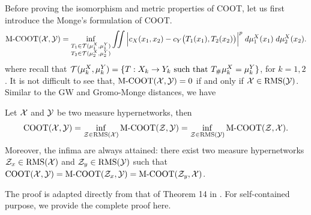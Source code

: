 Before proving the isomorphism and metric properties of COOT, let us first introduce the Monge's
formulation of COOT.
\begin{align}
  \text{M-COOT}(\mathcal X, \mathcal Y) =
  \inf_{\substack{T_1 \in \mathcal T(\mu^X_1, \mu^Y_1) \\ T_2 \in \mathcal T(\mu^X_2, \mu^Y_2)}}
  \iint \Big|c_X(x_1, x_2) - c_Y \big( T_1(x_1), T_2(x_2) \big) \Big|^p
  \; d\mu^X_1(x_1) \; d\mu^X_2(x_2).
\end{align}
where recall that
$\mathcal T(\mu^X_k, \mu^Y_k) = \{T: X_k \to Y_k \text{ such that } T_{\#} \mu^X_k = \mu^Y_k \}$,
for $k=1,2$. It is not difficult to see that, $\text{M-COOT}(\mathcal X, \mathcal Y) = 0$ if and only if
$\mathcal X \in \text{RMS}(\mathcal Y)$. Similar to the GW and Gromo-Monge distances, we have
\begin{corollary} \label{coro:coot_mcoot}
  Let $\mathcal X$ and $\mathcal Y$ be two measure hypernetworks, then
  \begin{equation}
    \text{COOT}(\mathcal X, \mathcal Y) = \inf_{\mathcal Z \in \text{RMS}(\mathcal X)} \text{M-COOT}(\mathcal Z, \mathcal Y)
    = \inf_{\mathcal Z \in \text{RMS}(\mathcal Y)} \text{M-COOT}(\mathcal Z, \mathcal X).
  \end{equation}
  Moreover, the infima are always attained: there exist two measure hypernetworks
  $\mathcal Z_x \in \text{RMS}(\mathcal X)$ and $\mathcal Z_y \in \text{RMS}(\mathcal Y)$ such that
  $\text{COOT}(\mathcal X, \mathcal Y) = \text{M-COOT}(\mathcal Z_x, \mathcal Y) = \text{M-COOT}(\mathcal Z_y, \mathcal X)$.
\end{corollary}
The proof is adapted directly from that of Theorem 14 in \citep{Memoli21}.
For self-contained purpose, we provide the complete proof here.

